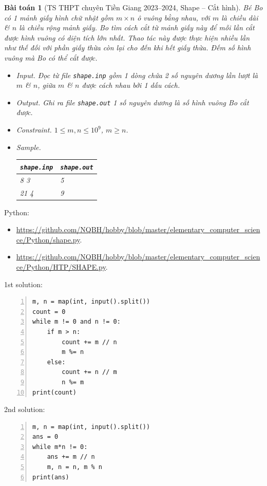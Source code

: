 \documentclass{article}
\newtheorem{baitoan}{Bài toán}
\begin{document}
\begin{baitoan}[TS THPT chuyên Tiền Giang 2023--2024, Shape -- Cắt hình]
	Bé Bo có 1 mảnh giấy hình chữ nhật gồm $m\times n$ ô vuông bằng nhau, với $m$ là chiều dài \& $n$ là chiều rộng mảnh giấy. Bo tìm cách cắt từ mảnh giấy này để mỗi lần cắt được hình vuông có diện tích lớn nhất. Thao tác này được thực hiện nhiều lần như thế đối với phần giấy thừa còn lại cho đến khi hết giấy thừa. Đếm số hình vuông mà Bo có thể cắt được.
	\begin{itemize}
		\item {\sf Input.} Đọc từ file {\tt shape.inp} gồm 1 dòng chứa 2 số nguyên dương lần lượt là $m$ \& $n$, giữa $m$ \& $n$ được cách nhau bởi 1 dấu cách.
		\item {\sf Output.} Ghi ra file {\tt shape.out} 1 số nguyên dương là số hình vuông Bo cắt được.
		\item {\sf Constraint.} $1\le m,n\le10^9$, $m\ge n$.
		\item {\sf Sample.}
		\begin{table}[H]
			\centering
			\begin{tabular}{|l|l|}
				\hline
				{\tt shape.inp} & {\tt shape.out} \\
				\hline
				8 3 & 5 \\
				\hline
				21 4 & 9 \\
				\hline
			\end{tabular}
		\end{table}
	\end{itemize}
\end{baitoan}
Python:
\begin{itemize}
	\item \url{https://github.com/NQBH/hobby/blob/master/elementary_computer_science/Python/shape.py}.
	\item \url{https://github.com/NQBH/hobby/blob/master/elementary_computer_science/Python/HTP/SHAPE.py}.
\end{itemize}
\newpage
\begin{multicols}{2}
	1st solution:
\begin{Verbatim}[numbers=left,xleftmargin=5mm]
m, n = map(int, input().split())
count = 0
while m != 0 and n != 0:
    if m > n:
        count += m // n
        m %= n
    else:
        count += n // m
        n %= m
print(count)
\end{Verbatim}
\columnbreak
	2nd solution:
\begin{Verbatim}[numbers=left,xleftmargin=5mm]
m, n = map(int, input().split())
ans = 0
while m*n != 0:
    ans += m // n
    m, n = n, m % n
print(ans)
\end{Verbatim}
\end{multicols}
\end{document}
